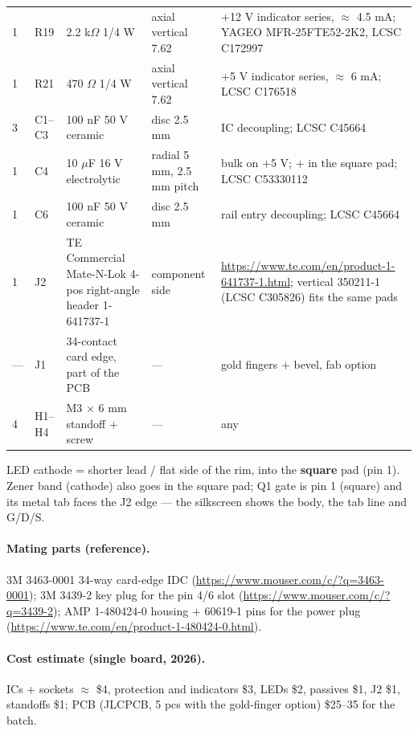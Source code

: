 \documentclass[11pt,a4paper]{article}
\begin{document}
\begin{longtable}{@{}p{8mm}p{18mm}p{52mm}p{22mm}p{62mm}@{}}
1 & R19 & 2.2 k$\Omega$ 1/4 W & axial vertical 7.62 & +12 V indicator series, $\approx$ 4.5 mA; YAGEO MFR-25FTE52-2K2, LCSC C172997\\
1 & R21 & 470 $\Omega$ 1/4 W & axial vertical 7.62 & +5 V indicator series, $\approx$ 6 mA; LCSC C176518\\
3 & C1--C3 & 100 nF 50 V ceramic & disc 2.5 mm & IC decoupling; LCSC C45664\\
1 & C4 & 10 $\mu$F 16 V electrolytic & radial 5 mm, 2.5 mm pitch & bulk on +5 V; + in the square pad; LCSC C53330112\\
1 & C6 & 100 nF 50 V ceramic & disc 2.5 mm & rail entry decoupling; LCSC C45664\\
1 & J2 & TE Commercial Mate-N-Lok 4-pos right-angle header 1-641737-1 & component side & \url{https://www.te.com/en/product-1-641737-1.html}; vertical 350211-1 (LCSC C305826) fits the same pads\\
--- & J1 & 34-contact card edge, part of the PCB & --- & gold fingers + bevel, fab option\\
4 & H1--H4 & M3 $\times$ 6 mm standoff + screw & --- & any\\
\bottomrule
\end{longtable}

LED cathode = shorter lead / flat side of the rim, into the \textbf{square} pad (pin 1). Zener band (cathode) also goes in the square pad; Q1 gate is pin 1 (square) and its metal tab faces the J2 edge --- the silkscreen shows the body, the tab line and G/D/S.

\paragraph{Mating parts (reference).}
3M 3463-0001 34-way card-edge IDC (\url{https://www.mouser.com/c/?q=3463-0001}); 3M 3439-2 key plug for the pin 4/6 slot
(\url{https://www.mouser.com/c/?q=3439-2}); AMP 1-480424-0 housing + 60619-1 pins for the power plug
(\url{https://www.te.com/en/product-1-480424-0.html}).

\paragraph{Cost estimate (single board, 2026).}
ICs + sockets $\approx$ \$4, protection and indicators \$3, LEDs \$2, passives \$1, J2 \$1, standoffs \$1; PCB (JLCPCB, 5 pcs with the gold-finger
option) \$25--35 for the batch.

\clearpage
\end{document}

